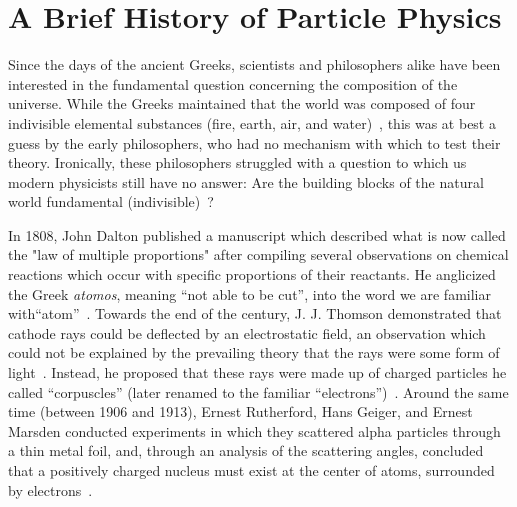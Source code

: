 \section{A Brief History of Particle Physics}\label{sec:a_brief_history_of_particle_physics}

Since the days of the ancient Greeks, scientists and philosophers alike have been interested in the fundamental question concerning the composition of the universe. While the Greeks maintained that the world was composed of four indivisible elemental substances (fire, earth, air, and water)~\cite{aristotle_metaphysics_350bce}, this was at best a guess by the early philosophers, who had no mechanism with which to test their theory. Ironically, these philosophers struggled with a question to which us modern physicists still have no answer: Are the building blocks of the natural world fundamental (indivisible)~\cite{aristotle_physics_350bce}?

In 1808, John Dalton published a manuscript which described what is now called the "law of multiple proportions" after compiling several observations on chemical reactions which occur with specific proportions of their reactants. He anglicized the Greek \textit{atomos}, meaning ``not able to be cut'', into the word we are familiar with\textemdash ``atom''~\cite{dalton_new_1808}. Towards the end of the century, J. J. Thomson demonstrated that cathode rays could be deflected by an electrostatic field, an observation which could not be explained by the prevailing theory that the rays were some form of light~\cite{thomson_cathode_1897}. Instead, he proposed that these rays were made up of charged particles he called ``corpuscles'' (later renamed to the familiar ``electrons'')~\cite{thomson_corpuscular_1907}. Around the same time (between 1906 and 1913), Ernest Rutherford, Hans Geiger, and Ernest Marsden conducted experiments in which they scattered alpha particles through a thin metal foil, and, through an analysis of the scattering angles, concluded that a positively charged nucleus must exist at the center of atoms, surrounded by electrons~\cite{rutherford_lxxix_1911}.

